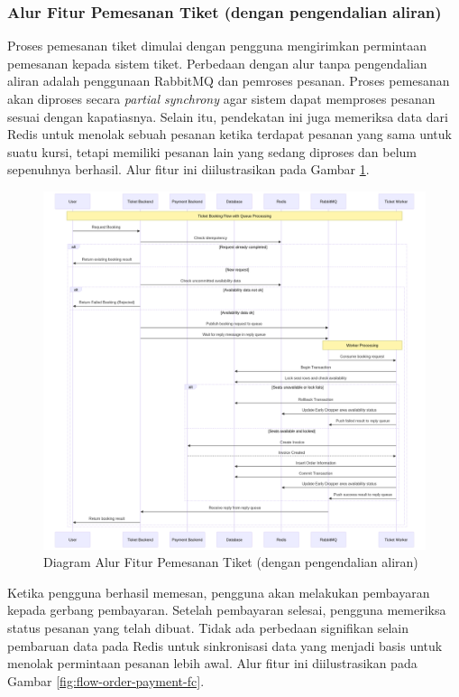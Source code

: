 \pagebreak

\subsubsection{Alur Fitur Pemesanan Tiket (dengan pengendalian aliran)}

Proses pemesanan tiket dimulai dengan pengguna mengirimkan permintaan pemesanan kepada sistem tiket. Perbedaan dengan alur tanpa pengendalian aliran adalah penggunaan RabbitMQ dan pemroses pesanan. Proses pemesanan akan diproses secara \textit{partial synchrony} agar sistem dapat memproses pesanan sesuai dengan kapatiasnya. Selain itu, pendekatan ini juga memeriksa data dari Redis untuk menolak sebuah pesanan ketika terdapat pesanan yang sama untuk suatu kursi, tetapi memiliki pesanan lain yang sedang diproses dan belum sepenuhnya berhasil. Alur fitur ini diilustrasikan pada Gambar \ref{fig:flow-book-fc}.

\begin{figure}[h]
    \centering
    \includegraphics[width=1\textwidth]{resources/chapter-3/book-async.png}
    \caption{Diagram Alur Fitur Pemesanan Tiket (dengan pengendalian aliran)}
    \label{fig:flow-book-fc}
\end{figure}

\pagebreak

Ketika pengguna berhasil memesan, pengguna akan melakukan pembayaran kepada gerbang pembayaran. Setelah pembayaran selesai, pengguna memeriksa status pesanan yang telah dibuat. Tidak ada perbedaan signifikan selain pembaruan data pada Redis untuk sinkronisasi data yang menjadi basis untuk menolak permintaan pesanan lebih awal. Alur fitur ini diilustrasikan pada Gambar \ref{fig:flow-order-payment-fc}.


